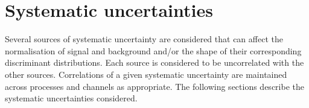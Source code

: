 \section{Systematic uncertainties}
\label{sec:systematics}
				   
Several sources of systematic uncertainty are considered that can affect the normalisation of signal 
and background and/or the shape of their corresponding discriminant distributions.  
Each source is considered to be uncorrelated with the other sources.  
Correlations of a given systematic uncertainty are maintained across processes and channels 
as appropriate.
The following sections describe the systematic uncertainties considered.

